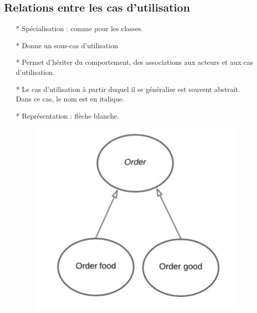\documentclass[12pt]{article}
\begin{document}
\subsection{Relations entre les cas d'utilisation}
\begin{itemize}
	\item [*] Spécialisation : comme pour les classes.
	\item[*] Donne un sous-cas d'utilisation
	\item [*] Permet d'hériter du comportement, des
	associations aux acteurs et aux cas d'utilisation.
	\item [*] Le cas d'utilisation à partir duquel il se généralise est souvent
	abstrait. Dans ce cas, le nom est en
	italique.
	\item [*] Représentation : flèche blanche.
	\begin{figure}[!hbtp]
		\includegraphics[scale=0.75]{Capture2.PNG}
	\end{figure}
\end{itemize}
\end{document}
